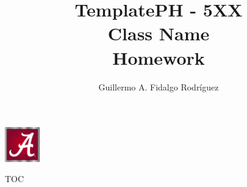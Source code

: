 \documentclass[aspectratio=1609]{beamer}
\title{Template}
\title{PH - 5XX \\ Class Name\\ Homework \HW}
\date{\thedate}
\author[G. Fidalgo]{Guillermo A. Fidalgo Rodríguez}
\institute[UA]{University of Alabama}
\begin{document}
% 	
% 	

\begin{frame}
	\titlepage
	\hfill
	\includegraphics[width=1.5cm]{Images/UA_logo.jpg}
\end{frame}

\begin{frame}{TOC}
	\tableofcontents
\end{frame}




% 
% 
% 
% 


\end{document}
